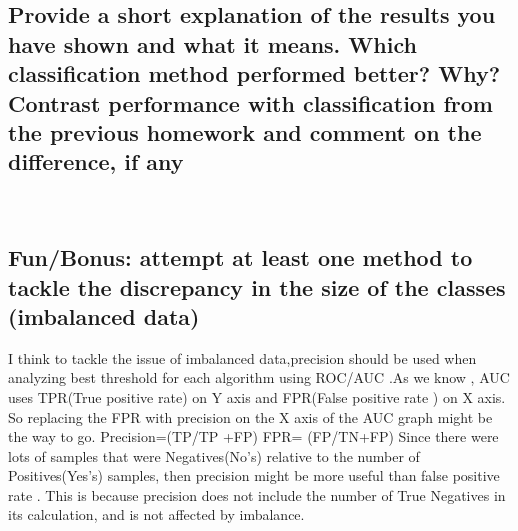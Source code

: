 \subsection{Provide a short explanation of the results you have shown and what it means. Which classification method performed better? Why? Contrast performance with classification from the previous homework and comment on the difference, if any}


\\

\subsection{ Fun/Bonus: attempt at least one method to tackle the discrepancy in the size of the classes (imbalanced data)}
 I think to tackle the issue of imbalanced data,precision should be used when analyzing best threshold for each algorithm using ROC/AUC .As we know , AUC uses TPR(True positive rate) on Y axis and FPR(False positive rate ) on X axis. So replacing the FPR with precision on the X axis of the AUC graph might be the way to go.
 Precision=(TP/TP +FP) FPR= (FP/TN+FP)
 Since there were lots of samples that were Negatives(No's) relative to the number of Positives(Yes's) samples, then precision might be more useful than false positive rate . This is because precision does not include the number of True Negatives in its calculation, and is not affected by imbalance.



